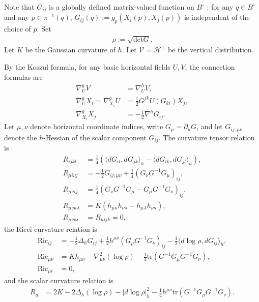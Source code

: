 \documentclass[letterpaper]{amsart}
\theoremstyle{definition}
\theoremstyle{remark}
\begin{document}
Note that $G_{ij}$ is a globally defined matrix-valued function on $B ^{\circ}$ : for any $q \in B ^{\circ}$ and any $p \in \pi ^{-1}(q)$, $G_{ij}(q) := g_{p}(X_i(p), X_j(p) )$ is independent of the choice of $p$. Set
\begin{align*}
	\rho := \sqrt{\mathrm{det} G} .
\end{align*} 
Let $K$ be the Gaussian curvature of $h$. Let $\mathcal{V} = \mathcal{H}^{\perp}$ be the vertical distribution.

By the Koszul formula, for any basic horizontal fields $U, V$, the connection formulas are
\begin{align*}
	\nabla ^{g}_{U} V &= \nabla ^{h}_{U} V,\\
	\nabla ^{g}_{U} X_i = \nabla ^{g}_{X_i} U &= \frac{1}{2} G ^{j k} U(G_{k i}) X_j, \\
	\nabla ^{g}_{X_i} X_j &= -\frac{1}{2} \nabla ^{h} G_{ij}.
\end{align*} 
Let $\mu,\nu$ denote horizontal coordinate indices, write $G_\mu=\partial_\mu G$, and let $G_{ij;\mu\nu}$ denote the $h$-Hessian of the scalar component $G_{ij}$. The curvature tensor relation is
\begin{align*}
R_{i j k l} &= \frac{1}{4} \left( \langle d G_{il}, d G_{jk} \rangle_{h} - \langle d G_{ik}, d G_{jl} \rangle_{h} \right), \\
	R_{\mu i \nu j} &= - \frac{1}{2} G_{ij; \mu \nu } + \frac{1}{4} (G_{\nu } G ^{-1} G_{\mu }) _{ij},\\
	R_{\mu \nu i j} &= \frac{1}{4}\left( G_{\nu } G ^{-1} G_{\mu } - G_{\mu } G^{-1} G_{\nu } \right) _{ij}, \\
	R_{\mu \nu \kappa \lambda }&= K (h_{\mu \kappa} h_{\nu  \lambda } - h_{\mu \lambda } h_{\nu \kappa}),\\
	R_{\mu \nu \kappa i} &= R_{\mu i j k} =0,
\end{align*} 
the Ricci curvature relation is
\begin{align*}
	\mathrm{Ric}_{ij} &= -\frac{1}{2} \Delta _{h} G_{ij} + \frac{1}{2} h ^{\mu \nu }\left( G_{\mu } G ^{-1} G_{\nu } \right) _{ij} - \frac{1}{2} \langle d \log \rho , d G_{ij} \rangle_{h},\\
	\mathrm{Ric}_{\mu \nu } &= K h_{\mu \nu } - \nabla ^2_{\mu \nu }(\log \rho )- \frac{1}{4} \mathrm{tr}(G ^{-1}G_{\mu } G ^{-1} G_{\nu }),\\
	\mathrm{Ric}_{\mu i} &=0,
\end{align*} 
and the scalar curvature relation is
\begin{align*}
	R_g &= 2K - 2\Delta _h (\log \rho ) - |d \log \rho |^2_h - \frac{1}{4} h ^{\mu \nu } \mathrm{tr}(G ^{-1} G_{\mu } G ^{-1} G_{\nu }).
\end{align*} 
\end{document}
